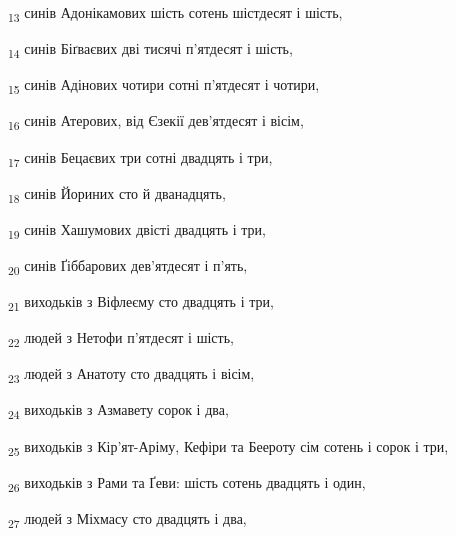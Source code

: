 \begin{tcolorbox}
\textsubscript{13} синів Адонікамових шість сотень шістдесят і шість,
\end{tcolorbox}
\begin{tcolorbox}
\textsubscript{14} синів Біґваєвих дві тисячі п'ятдесят і шість,
\end{tcolorbox}
\begin{tcolorbox}
\textsubscript{15} синів Адінових чотири сотні п'ятдесят і чотири,
\end{tcolorbox}
\begin{tcolorbox}
\textsubscript{16} синів Атерових, від Єзекії дев'ятдесят і вісім,
\end{tcolorbox}
\begin{tcolorbox}
\textsubscript{17} синів Бецаєвих три сотні двадцять і три,
\end{tcolorbox}
\begin{tcolorbox}
\textsubscript{18} синів Йориних сто й дванадцять,
\end{tcolorbox}
\begin{tcolorbox}
\textsubscript{19} синів Хашумових двісті двадцять і три,
\end{tcolorbox}
\begin{tcolorbox}
\textsubscript{20} синів Ґіббарових дев'ятдесят і п'ять,
\end{tcolorbox}
\begin{tcolorbox}
\textsubscript{21} виходьків з Віфлеєму сто двадцять і три,
\end{tcolorbox}
\begin{tcolorbox}
\textsubscript{22} людей з Нетофи п'ятдесят і шість,
\end{tcolorbox}
\begin{tcolorbox}
\textsubscript{23} людей з Анатоту сто двадцять і вісім,
\end{tcolorbox}
\begin{tcolorbox}
\textsubscript{24} виходьків з Азмавету сорок і два,
\end{tcolorbox}
\begin{tcolorbox}
\textsubscript{25} виходьків з Кір'ят-Аріму, Кефіри та Беероту сім сотень і сорок і три,
\end{tcolorbox}
\begin{tcolorbox}
\textsubscript{26} виходьків з Рами та Ґеви: шість сотень двадцять і один,
\end{tcolorbox}
\begin{tcolorbox}
\textsubscript{27} людей з Міхмасу сто двадцять і два,
\end{tcolorbox}
